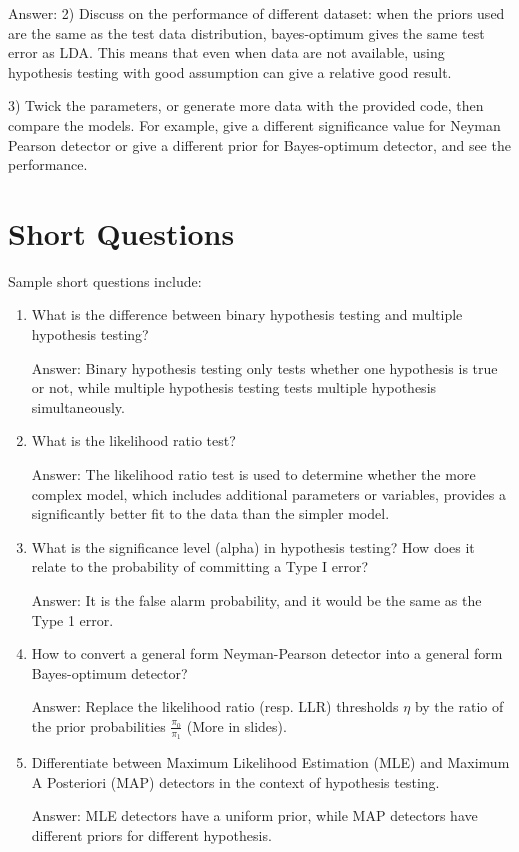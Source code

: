 \documentclass{article}
\newcommand{\ans}[1]{\par\textcolor{answer}{Answer: #1}}
\newenvironment{answer}{\par\begingroup\color{answer}Answer: }{\endgroup}
\begin{document}
\begin{itemize}
\begin{answer}
2) Discuss on the performance of different dataset: when the priors used are the same as the test data distribution, bayes-optimum gives the same test error as LDA. This means that even when data are not available, using hypothesis testing with good assumption can give a relative good result.

3) Twick the parameters, or generate more data with the provided code, then compare the models. For example, give a different significance value for Neyman Pearson detector or give a different prior for Bayes-optimum detector, and see the performance.

\end{answer}
\end{itemize}

\newpage

\section{Short Questions}
Sample short questions include:
\begin{enumerate}
    \item What is the difference between binary hypothesis testing and multiple hypothesis testing?
    \ans{Binary hypothesis testing only tests whether one hypothesis is true or not, while multiple hypothesis testing tests multiple hypothesis simultaneously.}
    \item What is the likelihood ratio test?
    \ans{The likelihood ratio test is used to determine whether the more complex model, which includes additional parameters or variables, provides a significantly better fit to the data than the simpler model.}
    \item What is the significance level (alpha) in hypothesis testing? How does it relate to the probability of committing a Type I error?
    \ans{It is the false alarm probability, and it would be the same as the Type 1 error.}
    \item How to convert a general form Neyman-Pearson detector into a general form Bayes-optimum detector?
    \ans {Replace the likelihood ratio (resp. LLR) thresholds $\eta$ by the ratio of the prior probabilities $\frac{\pi_0}{\pi_1}$ (More in slides).}
    \item Differentiate between Maximum Likelihood Estimation (MLE) and Maximum A Posteriori (MAP) detectors in the context of hypothesis testing.
    \ans{MLE detectors have a uniform prior, while MAP detectors have different priors for different hypothesis.}
\end{enumerate}
\end{document}
